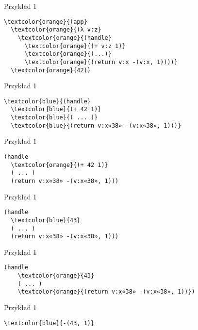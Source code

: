 \documentclass{beamer}
\begin{document}
\begin{frame}[fragile]{Przykład 1}
\begin{Verbatim}[commandchars=\\\{\}]
\textcolor{orange}{(app}
  \textcolor{orange}{(λ v:z}
    \textcolor{orange}{(handle}
      \textcolor{orange}{(+ v:z 1)}
      \textcolor{orange}{(...)}
      \textcolor{orange}{(return v:x -(v:x, 1))))}
  \textcolor{orange}{42)}
\end{Verbatim}
\end{frame}

\begin{frame}[fragile]{Przykład 1}
\begin{Verbatim}[commandchars=\\\{\}]
\textcolor{blue}{(handle}
  \textcolor{blue}{(+ 42 1)}
  \textcolor{blue}{( ... )}
  \textcolor{blue}{(return v:x«38» -(v:x«38», 1)))}
\end{Verbatim}
\end{frame}

\begin{frame}[fragile]{Przykład 1}
\begin{Verbatim}[commandchars=\\\{\}]
(handle
  \textcolor{orange}{(+ 42 1)}
  ( ... )
  (return v:x«38» -(v:x«38», 1)))
\end{Verbatim}
\end{frame}

\begin{frame}[fragile]{Przykład 1}
\begin{Verbatim}[commandchars=\\\{\}]
(handle
  \textcolor{blue}{43}
  ( ... )
  (return v:x«38» -(v:x«38», 1)))
\end{Verbatim}
\end{frame}

\begin{frame}[fragile]{Przykład 1}
  \begin{Verbatim}[commandchars=\\\{\}]
  (handle
    \textcolor{orange}{43}
    ( ... )
    \textcolor{orange}{(return v:x«38» -(v:x«38», 1))})
\end{Verbatim}
\end{frame}

\begin{frame}[fragile]{Przykład 1}
\begin{Verbatim}[commandchars=\\\{\}]
\textcolor{blue}{-(43, 1)}
\end{Verbatim}
\end{frame}
\end{document}
